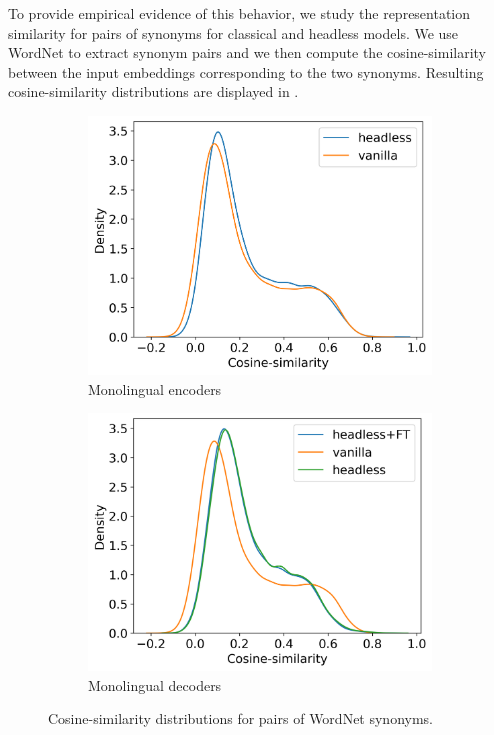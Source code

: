 To provide empirical evidence of this behavior, we study the representation similarity for pairs of synonyms for classical and headless models. 
We use WordNet \citep{Fellbaum1998} to extract synonym pairs and we then compute the cosine-similarity between the input embeddings corresponding to the two synonyms.
Resulting cosine-similarity distributions are displayed in .

\begin{figure}[H]
    \centering
    \begin{subfigure}[b]{0.48\columnwidth}
         \includegraphics[width=\linewidth]{sources/part_2/headless/imgs/input_embs_cosines_bert.png}
         \caption{Monolingual encoders}
         \label{fig:input_embs_cosines_bert}
    \end{subfigure}
    \begin{subfigure}[b]{0.48\columnwidth}
         \includegraphics[width=\linewidth]{sources/part_2/headless/imgs/input_embs_cosines_pythia.png}
         \caption{Monolingual decoders}
         \label{fig:input_embs_cosines_pythia}
    \end{subfigure}
    \caption{Cosine-similarity distributions for pairs of WordNet synonyms.}
    \label{fig:cosine_input_embs}
\end{figure}

